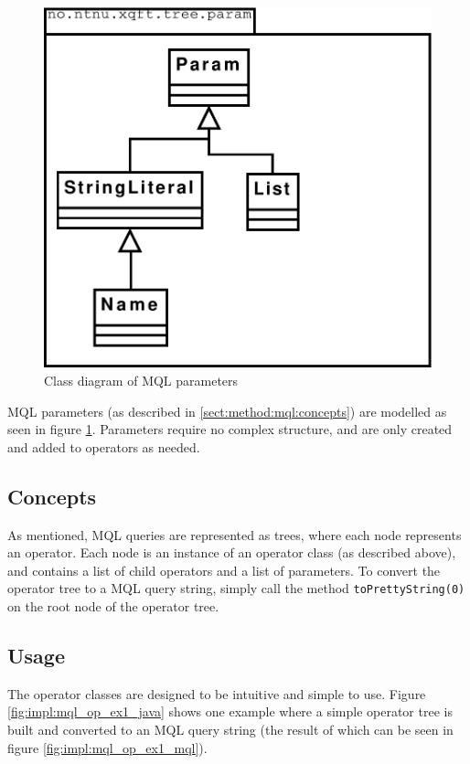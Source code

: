 \begin{figure}[!htp]
\begin{center}
  \includegraphics[scale=0.4]{diagrams/mql_param_uml}
  \caption{Class diagram of MQL parameters}
  \label{fig:impl:mql_param_uml}
\end{center}
\end{figure}

MQL parameters (as described in \ref{sect:method:mql:concepts}) are modelled as
seen in figure \ref{fig:impl:mql_param_uml}. Parameters require no complex
structure, and are only created and added to operators as needed.

\subsection{Concepts}
As mentioned, MQL queries are represented as trees, where each node represents
an operator. Each node is an instance of an operator class (as described
above), and contains a list of child operators and a list of parameters. To
convert the operator tree to a MQL query string, simply call the method
\texttt{toPrettyString(0)} on the root node of the operator tree.

\subsection{Usage}
The operator classes are designed to be intuitive and simple to use. Figure
\ref{fig:impl:mql_op_ex1_java} shows one example where a simple operator tree
is built and converted to an MQL query string (the result of which can be seen
in figure \ref{fig:impl:mql_op_ex1_mql}).

